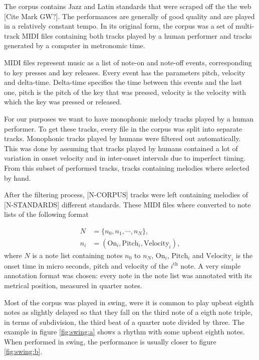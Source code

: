 The corpus contains Jazz and Latin standards that were scraped off the the web [Cite Mark GW?]. The performances are generally of good quality and are played in a relatively constant tempo. In its original form, the corpus was a set of multi-track MIDI files containing both tracks played by a human performer and tracks generated by a computer in metronomic time.

MIDI files represent music as a list of note-on and note-off events, corresponding to key presses and key releases. Every event has the parameters pitch, velocity and delta-time. Delta-time specifies the time between this events and the last one, pitch is the pitch of the key that was pressed, velocity is the velocity with which the key was pressed or released.

For our purposes we want to have monophonic melody tracks played by a human performer. To get these tracks, every file in the corpus was split into separate tracks. Monophonic tracks played by humans were filtered out automatically. This was done by assuming that tracks played by humans contained a lot of variation in onset velocity and in inter-onset intervals due to imperfect timing. From this subset of performed tracks, tracks containing melodies where selected by hand. 

After the filtering process, [N-CORPUS] tracks were left containing melodies of [N-STANDARDS] different standards. These MIDI files where converted to note lists of the following format

\begin{align*}
N &= \{n_0, n_1, \cdots, n_N\},\\
n_i &= (\mathrm{On}_i, \mathrm{Pitch}_i, \mathrm{Velocity}_i),
\end{align*}
where $N$ is a note list containing notes $n_0$ to $n_N$, $\mathrm{On}_i$, $\mathrm{Pitch}_i$ and $\mathrm{Velocity}_i$ is the onset time in micro seconds, pitch and velocity of the $i^{\mathrm{th}}$ note. A very simple annotation format was chosen: every note in the note list was annotated with its metrical position, measured in quarter notes. 

Most of the corpus was played in swing, were it is common to play upbeat eighth notes as slightly delayed so that they fall on the third note of a eigth note triple, in terms of subdivision, the third beat of a quarter note divided by three. The example in figure \ref{fig:swing:a} shows a rhythm with some upbeat eighth notes. When performed in swing, the performance is usually closer to figure \ref{fig:swing:b}.

